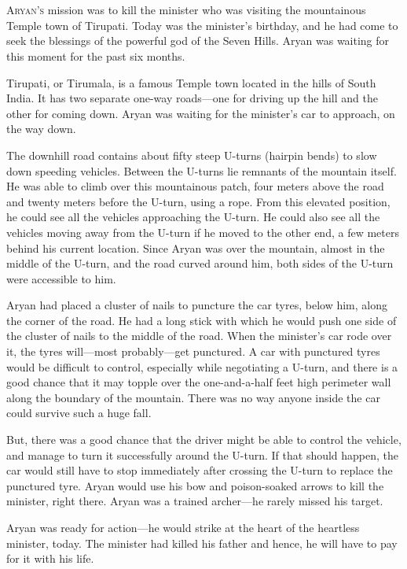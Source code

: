 
\chapter{}

\lettrine{A}{ryan's} mission was to kill the minister who was visiting the
mountainous Temple town of Tirupati. Today was the minister's birthday, and he
had come to seek the blessings of the powerful god of the Seven Hills. Aryan was
waiting for this moment for the past six months.

Tirupati, or Tirumala, is a famous Temple town located in the hills of South
India. It has two separate one-way roads—one for driving up the hill
and the other for coming down. Aryan was waiting for the minister's car to
approach, on the way down.

The downhill road contains about fifty steep U-turns (hairpin bends) to slow down
speeding vehicles. Between the U-turns lie remnants of the mountain itself.
He was able to climb over this mountainous patch, four meters above the road and
twenty meters before the U-turn, using a rope. From this elevated position, he
could see all the vehicles approaching the U-turn. He could also see all the
vehicles moving away from the U-turn if he moved to the other end, a few
meters behind his current location. Since Aryan was over the mountain, almost in
the middle of the U-turn, and the road curved around him, both sides of the
U-turn were accessible to him.

Aryan had placed a cluster of nails to puncture the car tyres, below him, along
the corner of the road. He had a long stick with which he would push one side of
the cluster of nails to the middle of the road. When the minister's car rode
over it, the tyres will—most probably—get punctured. A car with punctured
tyres would be difficult to control, especially while negotiating a U-turn, and
there is a good chance that it may topple over the one-and-a-half feet high
perimeter wall along the boundary of the mountain. There was no way anyone
inside the car could survive such a huge fall.

But, there was a good chance that the driver might be able to control the
vehicle, and manage to turn it successfully around the U-turn. If that
should happen, the car would still have to stop immediately after crossing the
U-turn to replace the punctured tyre. Aryan would use his bow and
poison-soaked arrows to kill the minister, right there. Aryan was a trained
archer—he rarely missed his target.

Aryan was ready for action—he would strike at the heart of the heartless minister,
today. The minister had killed his father and hence, he will have to pay for it
with his life.

